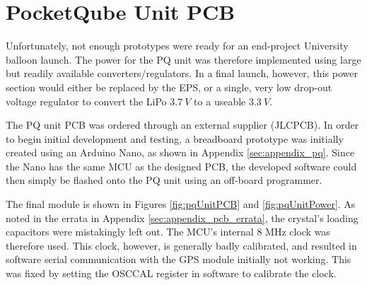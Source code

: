 \graphicspath{{./figures}}

\section{PocketQube Unit PCB}
Unfortunately, not enough prototypes were ready for an end-project University balloon launch. The power for the PQ unit was therefore implemented using large but readily available converters/regulators. In a final launch, however, this power section would either be replaced by the EPS, or a single, very low drop-out voltage regulator to convert the LiPo $\SI{3.7}{V}$ to a useable $\SI{3.3}{V}$.

The PQ unit PCB was ordered through an external supplier (JLCPCB). In order to begin initial development and testing, a breadboard prototype was initially created using an Arduino Nano, as shown in Appendix \ref{sec:appendix_pq}. Since the Nano has the same MCU as the designed PCB, the developed software could then simply be flashed onto the PQ unit using an off-board programmer.

The final module is shown in Figures \ref{fig:pqUnitPCB} and \ref{fig:pqUnitPower}. As noted in the errata in Appendix \ref{sec:appendix_pcb_errata}, the crystal's loading capacitors were mistakingly left out. The MCU's internal 8 MHz clock was therefore used. This clock, however, is generally badly calibrated, and resulted in software serial communication with the GPS module initially not working. This was fixed by setting the OSCCAL register in software to calibrate the clock.

